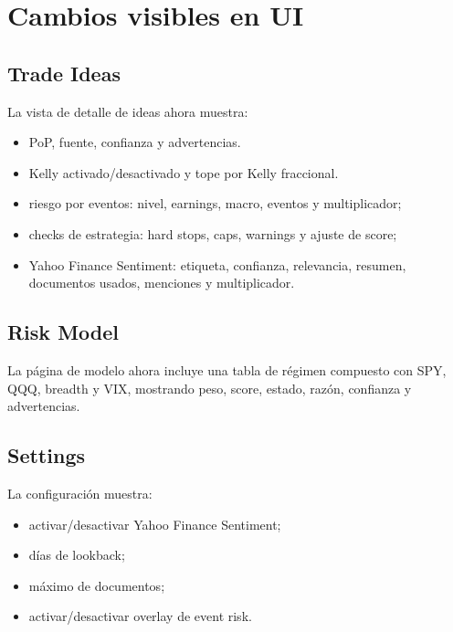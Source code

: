 \documentclass[11pt,letterpaper]{article}
\begin{document}
\section{Cambios visibles en UI}

\subsection{Trade Ideas}

La vista de detalle de ideas ahora muestra:

\begin{itemize}[noitemsep]
  \item PoP, fuente, confianza y advertencias.
  \item Kelly activado/desactivado y tope por Kelly fraccional.
  \item riesgo por eventos: nivel, earnings, macro, eventos y multiplicador;
  \item checks de estrategia: hard stops, caps, warnings y ajuste de score;
  \item Yahoo Finance Sentiment: etiqueta, confianza, relevancia, resumen,
        documentos usados, menciones y multiplicador.
\end{itemize}

\subsection{Risk Model}

La p\'agina de modelo ahora incluye una tabla de r\'egimen compuesto con SPY, QQQ,
breadth y VIX, mostrando peso, score, estado, raz\'on, confianza y advertencias.

\subsection{Settings}

La configuraci\'on muestra:

\begin{itemize}[noitemsep]
  \item activar/desactivar Yahoo Finance Sentiment;
  \item d\'ias de lookback;
  \item m\'aximo de documentos;
  \item activar/desactivar overlay de event risk.
\end{itemize}

\end{document}
